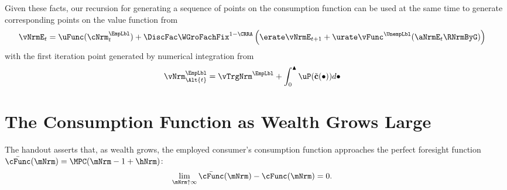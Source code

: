 \documentclass{econark}
\begin{document}
Given these facts, our recursion for generating a sequence of points on the consumption
function can be used at the same time to generate corresponding points on the value function from
\begin{equation}\begin{gathered}\begin{aligned}
  \vNrmE_{t} & =  \uFunc({\cNrm}^{\EmpLbl}_{t})+\DiscFac \WGroFachFix^{1-\CRRA} \left(\erate \vNrmE_{t+1} + \urate \vFunc^{\UnempLbl}(\aNrmE_{t} \RNrmByG)\right)
\end{aligned}\end{gathered}\end{equation}
with the first iteration point generated by numerical integration from 
\begin{equation}\begin{gathered}\begin{aligned}
  \vNrm^{\EmpLbl}_{\Alt{t}} & =  \vTrgNrm^{\EmpLbl}+\int_{0}^{\blacktriangle} \uP(\tilde{\mathbf{c}}(\bullet)) d\bullet
\end{aligned}\end{gathered}\end{equation}



\section{The Consumption Function as Wealth Grows Large} \label{sec:PGroGEQRfree}

The handout asserts that, as wealth grows, the employed consumer's consumption function approaches the perfect foresight function $\bar{\cFunc}(\mNrm) = \MPC(\mNrm-1+\hNrm)$:
\begin{equation}\begin{gathered}\begin{aligned}
  \lim_{\mNrm \uparrow \infty} \bar{\cFunc}(\mNrm) - \cFunc(\mNrm) & =  0 .
\end{aligned}\end{gathered}\end{equation}
\end{document}

